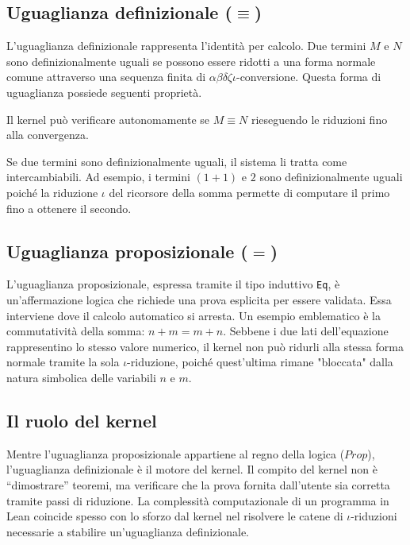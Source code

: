 \subsection{Uguaglianza definizionale (\texorpdfstring{$\equiv$}{equiv})}
L'uguaglianza definizionale rappresenta l'identità per calcolo. Due termini $M$ e $N$ sono definizionalmente uguali se possono essere ridotti a 
una forma normale comune attraverso una sequenza finita di $\alpha\beta\delta\zeta\iota$-conversione. Questa forma di uguaglianza possiede seguenti
proprietà.
\begin{description}[leftmargin=1.5em, style=nextline, font=\bfseries]
    \item [Decidibilità] 
        Il kernel può verificare autonomamente se $M \equiv N$ rieseguendo le riduzioni fino alla convergenza.
    \item [Trasparenza] 
        Se due termini sono definizionalmente uguali, il sistema li tratta come intercambiabili. Ad esempio, i termini $(1+1)$ e 
        $2$ sono definizionalmente uguali poiché la riduzione $\iota$ del ricorsore della somma permette di computare il primo fino 
        a ottenere il secondo.
\end{description}


\subsection{Uguaglianza proposizionale (\texorpdfstring{$=$}{eq})}
L'uguaglianza proposizionale, espressa tramite il tipo induttivo \texttt{Eq}, è un'affermazione logica che richiede una prova esplicita per essere 
validata. Essa interviene dove il calcolo automatico si arresta. Un esempio emblematico è la commutatività della somma: $n + m = m + n$. Sebbene i due 
lati dell'equazione rappresentino lo stesso valore numerico, il kernel non può ridurli alla stessa forma normale tramite la sola $\iota$-riduzione, 
poiché quest'ultima rimane "bloccata" dalla natura simbolica delle variabili $n$ e $m$.

\subsection{Il ruolo del kernel}
Mentre l'uguaglianza proposizionale appartiene al regno della logica ($Prop$), l'uguaglianza definizionale è il motore del kernel. Il compito del kernel non è 
``dimostrare'' teoremi, ma verificare che la prova fornita dall'utente sia corretta tramite passi di riduzione. La complessità computazionale di un programma in 
Lean coincide spesso con lo sforzo dal kernel nel risolvere le catene di $\iota$-riduzioni necessarie a stabilire un'uguaglianza definizionale.

